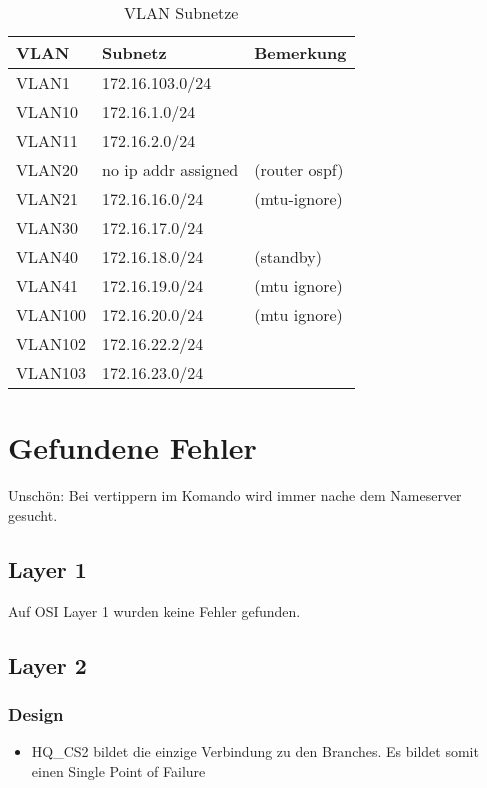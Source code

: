 \begin{table}[h]
	\centering
	\begin{tabu} to \linewidth {l l l}
		\toprule 
		VLAN & Subnetz & Bemerkung \\
		\midrule
		VLAN1 & 172.16.103.0/24 & \\
		VLAN10 & 172.16.1.0/24 & \\
		VLAN11 & 172.16.2.0/24 & \\
		VLAN20 & no ip addr assigned & (router ospf) \\
		VLAN21 & 172.16.16.0/24 & (mtu-ignore) \\
		VLAN30 & 172.16.17.0/24 & \\
		VLAN40 & 172.16.18.0/24 & (standby) \\
		VLAN41 & 172.16.19.0/24 & (mtu ignore) \\
		VLAN100 & 172.16.20.0/24 & (mtu ignore) \\
		VLAN102 & 172.16.22.2/24 & \\
		VLAN103 & 172.16.23.0/24 & \\
		\bottomrule 
	\end{tabu} 
	\caption{VLAN Subnetze}
\end{table}




\section{Gefundene Fehler}

Unschön: Bei vertippern im Komando wird immer nache dem Nameserver gesucht.

\subsection{Layer 1}
Auf OSI Layer 1 wurden keine Fehler gefunden.

\subsection{Layer 2}

\subsubsection{Design}
\begin{itemize}
	\item HQ\_CS2 bildet die einzige Verbindung zu den Branches. Es bildet somit einen Single Point of Failure
\end{itemize}

